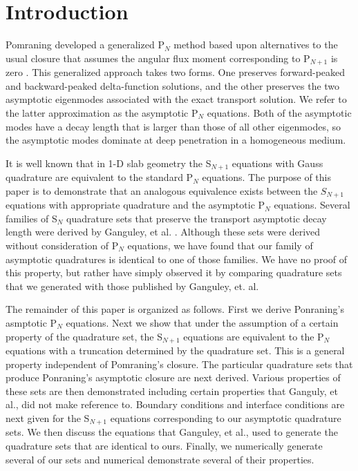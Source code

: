 \documentclass[12pt]{article}
\begin{document}
\section{Introduction}

Pomraning developed a generalized P$_N$ method based upon alternatives to the usual closure that 
assumes the angular flux moment corresponding to P$_{N+1}$ is zero \cite{pomraning}.  This generalized 
approach takes two forms.  One preserves forward-peaked and backward-peaked delta-function solutions, 
and the other preserves the two asymptotic eigenmodes associated with the exact transport 
solution. We refer to the latter approximation as the asymptotic P$_N$ equations.  Both of the asymptotic 
modes have a decay length that is larger than those of all other eigenmodes, so the asymptotic modes 
dominate at deep penetration in a homogeneous medium.   


It is well known that in 1-D slab geometry the S$_{N+1}$ equations with Gauss quadrature are equivalent 
to the standard P$_{N}$ equations.  The purpose of this paper is to demonstrate that an analogous equivalence 
exists between the $S_{N+1}$ equations with appropriate quadrature and the asymptotic P$_N$ equations.  Several 
families of S$_N$ quadrature sets that preserve the transport asymptotic decay length were derived by Ganguley, 
et al. \cite{ganguley}. Although these sets were derived without consideration of P$_N$ equations, we have found 
that our family of asymptotic quadratures is identical to one of those families. We have no proof of this property, 
but rather have simply observed it by comparing quadrature sets that we generated with those published 
by Ganguley, et. al. 

The remainder of this paper is organized as follows.  First we derive Ponraning's asmptotic P$_N$ equations. 
Next we show that under the assumption of a certain property of the quadrature set, the S$_{N+1}$ equations are 
equivalent to the P$_N$ equations with a truncation determined by the quadrature set. This is a general property 
independent of Pomraning's closure.  The particular quadrature sets that produce Ponraning's asymptotic closure 
are next derived.  Various properties of these sets are then demonstrated including certain properties that 
Ganguly, et al., did not make reference to.  Boundary conditions and interface conditions are next given for the 
S$_{N+1}$ equations corresponding to our asymptotic quadrature sets. We then discuss the equations that 
Ganguley, et al., used to generate the quadrature sets that are identical to ours. Finally, we numerically generate 
several of our sets and numerical demonstrate several of their properties. 
\end{document}
